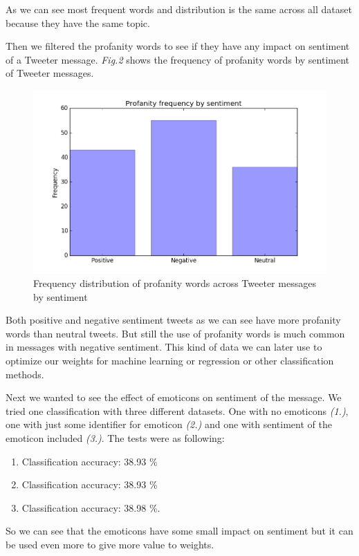 \documentclass[runningheads,a4paper]{llncs}
\begin{document}
As we can see most frequent words and distribution is the same across all dataset because they have the same topic.

Then we filtered the profanity words to see if they have any impact on sentiment of a Tweeter message. \emph{Fig.2} shows the frequency of profanity words by sentiment of Tweeter messages.

\begin{figure}
\centerline{\includegraphics[scale=0.35]{figure_fdist_sentiment.png}}
\caption{Frequency distribution of profanity words across Tweeter messages by sentiment}
\label{fig:Image4}
\end{figure}

Both positive and negative sentiment tweets as we can see have more profanity words than neutral tweets. But still the use of profanity words is much common in messages with negative sentiment. This kind of data we can later use to optimize our weights for machine learning or regression or other classification methods.

Next we wanted to see the effect of emoticons on sentiment of the message. We tried one classification with three different datasets. One with no emoticons \emph{(1.)}, one with just some identifier for emoticon \emph{(2.)} and one with sentiment of the emoticon included \emph{(3.)}. The tests were as following:
\begin{enumerate}
	\item Classification accuracy: 38.93 \%
	\item Classification accuracy: 38.93 \%
	\item Classification accuracy: 38.98 \%.
\end{enumerate}
So we can see that the emoticons have some small impact on sentiment but it can be used even more to give more value to weights.
\end{document}
